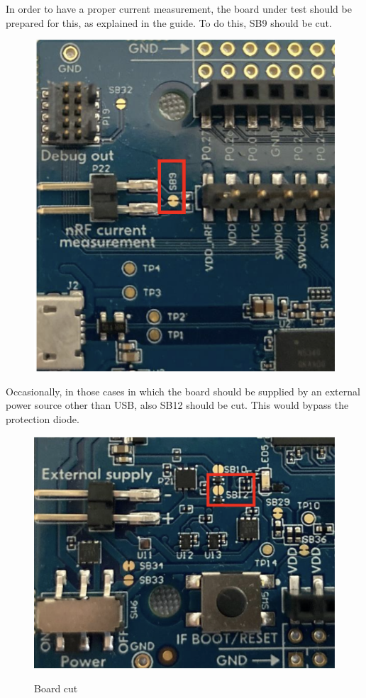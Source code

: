 \documentclass{Configuration_Files/PoliMi3i_thesis}
\begin{document}
In order to have a proper current measurement, the board under test should be prepared for this, as explained in the guide.
To do this, SB9 should be cut.

\begin{figure}[H]
    \centering
    \includegraphics[scale=0.6]{Test_Procedure/15.png}
    \label{direct_communication_board_PC_15}
\end{figure}

Occasionally, in those cases in which the board should be supplied by an external power source other than USB, also SB12 should be cut. This would bypass the protection diode.

\begin{figure}[H]
    \centering
    \includegraphics[scale=0.6]{Test_Procedure/16.png}
    \label{direct_communication_board_PC_16}
    \caption{Board cut}
\end{figure}
\end{document}
